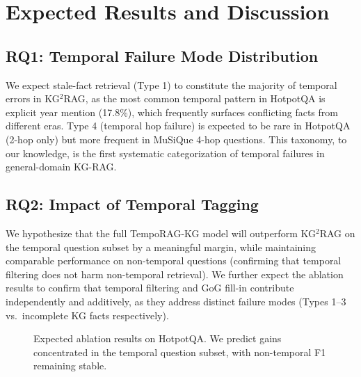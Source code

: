 \documentclass[11pt]{article}
\begin{document}
\section{Expected Results and Discussion}

\subsection{RQ1: Temporal Failure Mode Distribution}

We expect stale-fact retrieval (Type 1) to constitute the majority of
temporal errors in KG$^2$RAG, as the most common temporal pattern in
HotpotQA is explicit year mention (17.8\%), which frequently surfaces
conflicting facts from different eras. Type 4 (temporal hop failure) is
expected to be rare in HotpotQA (2-hop only) but more frequent in
MuSiQue 4-hop questions. This taxonomy, to our knowledge, is the first
systematic categorization of temporal failures in general-domain KG-RAG.

\subsection{RQ2: Impact of Temporal Tagging}

We hypothesize that the full TempoRAG-KG model will outperform
KG$^2$RAG on the temporal question subset by a meaningful margin,
while maintaining comparable performance on non-temporal questions
(confirming that temporal filtering does not harm non-temporal retrieval).
We further expect the ablation results to confirm that temporal filtering
and GoG fill-in contribute independently and additively, as they address
distinct failure modes (Types 1--3 vs.\ incomplete KG facts respectively).

\begin{figure}[t]
  \centering
  \caption{Expected ablation results on HotpotQA. We predict gains
  concentrated in the temporal question subset, with non-temporal F1
  remaining stable.}
  \label{fig:ablation}
\end{figure}
\end{document}
